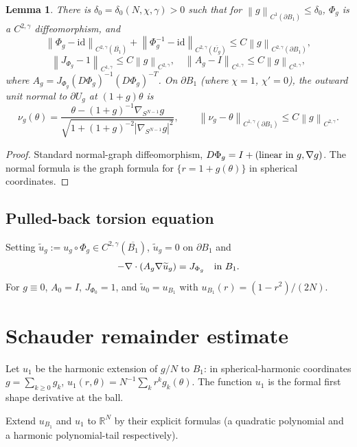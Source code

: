 \documentclass[11pt]{article}
\newtheorem{lemma}[theorem]{Lemma}
\theoremstyle{definition}
\newcommand{\R}{\mathbb{R}}
\newcommand{\norm}[1]{\left\|#1\right\|}
\newcommand{\abs}[1]{\left|#1\right|}
\begin{document}
\begin{lemma}\label{lem:pullback}
There is $\delta_0=\delta_0(N,\chi,\gamma)>0$ such that for
$\norm{g}_{C^{1}(\partial B_1)}\le\delta_0$, $\Phi_g$ is a $C^{2,\gamma}$
diffeomorphism, and
\[
\norm{\Phi_g-\mathrm{id}}_{C^{2,\gamma}(\overline{B_1})}
+\norm{\Phi_g^{-1}-\mathrm{id}}_{C^{2,\gamma}(\overline{U_g})}
\le C\norm{g}_{C^{2,\gamma}(\partial B_1)},
\]
\[
\norm{J_{\Phi_g}-1}_{C^{1,\gamma}}\le C\norm{g}_{C^{2,\gamma}},
\quad
\norm{A_g-I}_{C^{1,\gamma}}\le C\norm{g}_{C^{2,\gamma}},
\]
where $A_g=J_{\Phi_g}(D\Phi_g)^{-1}(D\Phi_g)^{-T}$. On
$\partial B_1$ (where $\chi=1$, $\chi'=0$), the outward unit normal to
$\partial U_g$ at $(1+g)\theta$ is
\[
\nu_g(\theta)
=
\frac{\theta-(1+g)^{-1}\nabla_{S^{N-1}}g}
{\sqrt{1+(1+g)^{-2}\abs{\nabla_{S^{N-1}}g}^2}},
\qquad
\norm{\nu_g-\theta}_{C^{1,\gamma}(\partial B_1)}\le C\norm{g}_{C^{2,\gamma}}.
\]
\end{lemma}

\begin{proof}
Standard normal-graph diffeomorphism, $D\Phi_g=I+(\hbox{linear in }g,\nabla g)$.
The normal formula is the graph formula for $\{r=1+g(\theta)\}$ in spherical
coordinates.
\end{proof}

\subsection{Pulled-back torsion equation}

Setting $\widetilde u_g:=u_g\circ\Phi_g\in C^{2,\gamma}(\overline{B_1})$,
$\widetilde u_g=0$ on $\partial B_1$ and
\begin{equation}\label{eq:pulledback}
-\nabla\cdot(A_g\nabla\widetilde u_g)=J_{\Phi_g}\quad\hbox{in }B_1.
\end{equation}
For $g\equiv0$, $A_0=I$, $J_{\Phi_0}=1$, and $\widetilde u_0=u_{B_1}$ with
$u_{B_1}(r)=(1-r^2)/(2N)$.

\section{Schauder remainder estimate}

Let $u_1$ be the harmonic extension of $g/N$ to $B_1$: in spherical-harmonic
coordinates $g=\sum_{k\ge0}g_k$, $u_1(r,\theta)=N^{-1}\sum_k r^k g_k(\theta)$.
The function $u_1$ is the formal first shape derivative at the ball.

Extend $u_{B_1}$ and $u_1$ to $\R^N$ by their explicit formulas (a quadratic
polynomial and a harmonic polynomial-tail respectively).
\end{document}
